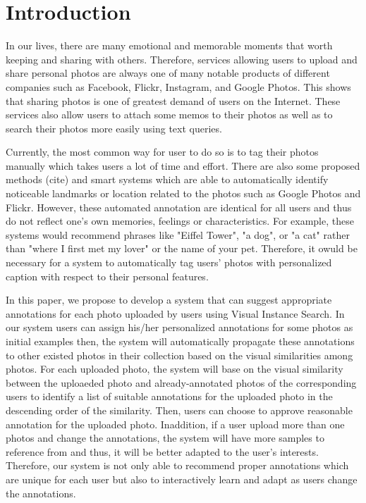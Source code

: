 % 

\section{Introduction} \label{section:introduction}

In our lives, there are many emotional and memorable moments that worth keeping and sharing with others. Therefore, services allowing users to upload and share personal photos are always one of many notable products of different companies such as Facebook, Flickr, Instagram, and Google Photos. This shows that sharing photos is one of greatest demand of users on the Internet. These services also allow users to attach some memos to their photos as well as to search their photos more easily using text queries.

Currently, the most common way for user to do so is to tag their photos manually which takes users a lot of time and effort. There are also some proposed methods (cite) and smart systems which are able to automatically identify noticeable landmarks or location related to the photos such as Google Photos and Flickr. However, these automated annotation are identical for all users and thus do not reflect one's own memories, feelings or characteristics. For example, these systems would recommend phrases like "Eiffel Tower", "a dog", or "a cat" rather than "where I first met my lover" or the name of your pet. Therefore, it owuld be necessary for a system to automatically tag users' photos with personalized caption with respect to their personal features.

In this paper, we propose to develop a system that can suggest appropriate annotations for each photo uploaded by users using Visual Instance Search. In our system users can assign his/her personalized annotations for some photos as initial examples then, the system will automatically propagate these annotations to other existed photos in their collection based on the visual similarities among photos. For each uploaded photo, the system will base on the visual similarity between the uploaeded photo and already-annotated photos of the corresponding users to identify a list of suitable annotations for the uploaded photo in the descending order of the similarity. Then, users can choose to approve reasonable annotation for the uploaded photo. Inaddition, if a user upload more than one photos and change the annotations, the system will have more samples to reference from and thus, it will be better adapted to the user's interests. Therefore, our system is not only able to recommend proper annotations which are unique for each user but also to interactively learn and adapt as users change the annotations.

